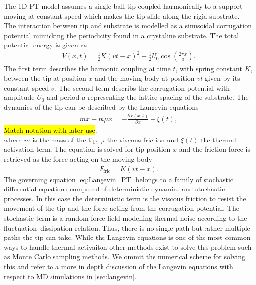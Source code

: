 The 1D \acrshort{PT} model assumes a single ball-tip coupled harmonically to a support moving at constant speed which makes the tip slide along the rigid substrate. The interaction between tip and substrate is modelled as a sinusoidal corrugation potential mimicking the periodicity found in a crystaline substrate. The total potential energy is given as
\begin{align}
  V(x,t) = \frac{1}{2}K(vt - x)^2 - \frac{1}{2}U_0 \cos \left(\frac{2\pi x}{a} \right).
  \label{eq:V_PT}
\end{align}
The first term describes the harmonic coupling at time $t$, with spring constant $K$, between the tip at position $x$ and the moving body at position $vt$ given by its constant speed $v$. The second term describs the corrugation potential with amplitude $U_0$ and period $a$ representing the lattice spacing of the substrate. The dynamics of the tip can be described by the Langevin equations 
\begin{align}
  m \ddot{x}+m \mu \dot{x}=-\frac{\partial V(x, t)}{\partial x}+\xi(t),
  \label{eq:Langevin_PT}
\end{align}
\hl{Match notation with later use}. \\
where $m$ is the mass of the tip, $\mu$ the viscous friction and $\xi(t)$ the thermal activation term. The equation is solved for tip position $x$ and the friction force is retrieved as the force acting on the moving body
\begin{align*}
  F_{\text{fric}} = K(vt - x).
\end{align*}
The governing equation \cref{eq:Langevin_PT} belongs to a family of stochastic differential equations composed of deterministic dynamics and stochastic processes. In this case the deterministic term is the viscous friction to resist the movement of the tip and the force acting from the corrugation potential. The stochastic term is a random force field modelling thermal noise according to the fluctuation–dissipation relation. Thus, there is no single path but rather multiple paths the tip can take. While the Langevin equations is one of the most common ways to handle thermal activaiton other methods exist to solve this problem such as Monte Carlo sampling methods. We ommit the numerical scheme for solving this and refer to a more in depth discussion of the Langevin equations with respect to \acrshort{MD} simulations in \cref{sec:langevin}. 


